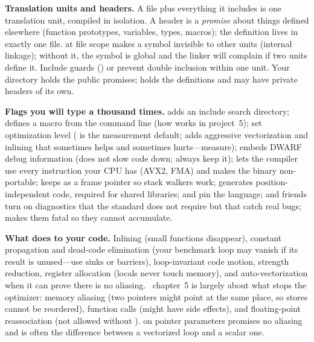 \textbf{Translation units and headers.} A  file plus everything it includes is one translation unit, compiled in isolation. A header is a \emph{promise} about things defined elsewhere (function prototypes,  variables, types, macros); the definition lives in exactly one  file.  at file scope makes a symbol invisible to other units (internal linkage); without it, the symbol is global and the linker will complain if two units define it. Include guards () or  prevent double inclusion within one unit. Your  directory holds the public promises;  holds the definitions and may have private headers of its own.

\textbf{Flags you will type a thousand times.}  adds an include search directory;  defines a macro from the command line (how  works in project~5);  set optimization level ( is the measurement default;  adds aggressive vectorization and inlining that sometimes helps and sometimes hurts---measure);  embeds DWARF debug information (does not slow code down; always keep it);  lets the compiler use every instruction your CPU has (AVX2, FMA) and makes the binary non-portable;  keeps  as a frame pointer so stack walkers work;  generates position-independent code, required for shared libraries;  and  pin the language;  and friends turn on diagnostics that the standard does not require but that catch real bugs;  makes them fatal so they cannot accumulate.

\textbf{What  does to your code.} Inlining (small functions disappear), constant propagation and dead-code elimination (your benchmark loop may vanish if its result is unused---use  sinks or  barriers), loop-invariant code motion, strength reduction, register allocation (locals never touch memory), and auto-vectorization when it can prove there is no aliasing. \csapp\ chapter~5 is largely about what stops the optimizer: memory aliasing (two pointers might point at the same place, so stores cannot be reordered), function calls (might have side effects), and floating-point reassociation (not allowed without ).  on pointer parameters promises no aliasing and is often the difference between a vectorized loop and a scalar one.

